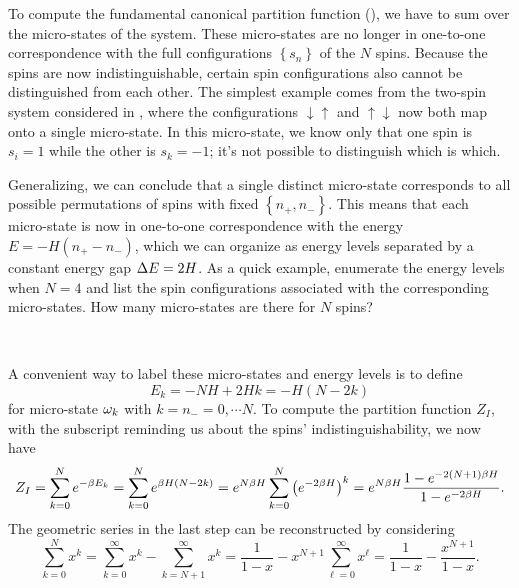 To compute the fundamental canonical partition function (), we have to sum over the micro-states of the system.
These micro-states are no longer in one-to-one correspondence with the full configurations $\left\{s_n\right\}$ of the $N$ spins.
Because the spins are now indistinguishable, certain spin configurations also cannot be distinguished from each other.
The simplest example comes from the two-spin system considered in , where the configurations $\downarrow\uparrow$ and $\uparrow\downarrow$ now both map onto a single micro-state.
In this micro-state, we know only that one spin is $s_i = 1$ while the other is $s_k = -1$; it's not possible to distinguish which is which.

Generalizing, we can conclude that a single distinct micro-state corresponds to all possible permutations of spins with fixed $\left\{n_+, n_-\right\}$.
This means that each micro-state is now in one-to-one correspondence with the energy $E = -H(n_+ - n_-)$, which we can organize as energy levels separated by a constant energy gap $\Delta E = 2H$.
As a quick example, enumerate the energy levels when $N = 4$ and list the spin configurations associated with the corresponding micro-states.
How many micro-states are there for $N$ spins?
\begin{mdframed}
  \ \\[120 pt]
\end{mdframed}

A convenient way to label these micro-states and energy levels is to define
\begin{equation*}
  E_k = -NH + 2Hk = -H(N - 2k)
\end{equation*}
for micro-state $\omega_k$ with $k = n_- = 0, \cdots N$.
To compute the partition function $Z_I$, with the subscript reminding us about the spins' indistinguishability, we now have
\begin{equation}
  Z_I = \sum_{k = 0}^N e^{-\beta E_k} = \sum_{k = 0}^N e^{\beta H (N - 2k)} = e^{N\beta H} \sum_{k = 0}^N \left(e^{-2\beta H}\right)^k = e^{N\beta H} \frac{1 - e^{-2(N + 1) \beta H}}{1 - e^{-2\beta H}}.
\end{equation}
The geometric series in the last step can be reconstructed by considering
\begin{equation*}
  \sum_{k = 0}^N x^k = \sum_{k = 0}^{\infty} x^k - \sum_{k = N + 1}^{\infty} x^k = \frac{1}{1 - x} - x^{N + 1} \sum_{\ell = 0}^{\infty} x^{\ell} = \frac{1}{1 - x} - \frac{x^{N + 1}}{1 - x}.
\end{equation*}


